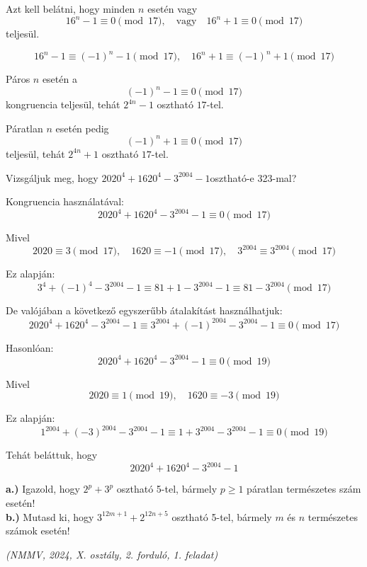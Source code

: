 \begin{solution}
	Azt kell belátni, hogy minden $n$ esetén vagy 
	\[
	16^{n}-1\equiv0\pmod{17},\quad\text{vagy}\quad16^{n}+1\equiv0\pmod{17}
	\]
	teljesül.
	
	\[
	16^{n}-1\equiv(-1)^{n}-1\pmod{17},\quad16^{n}+1\equiv(-1)^{n}+1\pmod{17}
	\]
	
	Páros $n$ esetén a 
	\[
	(-1)^{n}-1\equiv0\pmod{17}
	\]
	kongruencia teljesül, tehát $2^{4n}-1$ osztható $17$-tel.
	
	Páratlan $n$ esetén pedig 
	\[
	(-1)^{n}+1\equiv0\pmod{17}
	\]
	teljesül, tehát $2^{4n}+1$ osztható $17$-tel. 
\end{solution}
\vspace{0.5cm}

\begin{extraproblem}
	Vizsgáljuk meg, hogy $2020^{4}+1620^{4}-3^{2004}-1$\quad{}osztható-e
	323-mal?
\end{extraproblem}

\vspace{0.5cm}

\begin{solution}
	Kongruencia használatával: 
	\[
	2020^{4}+1620^{4}-3^{2004}-1\equiv0\pmod{17}
	\]
	
	Mivel 
	\[
	2020\equiv3\pmod{17},\quad1620\equiv-1\pmod{17},\quad3^{2004}\equiv3^{2004}\pmod{17}
	\]
	
	Ez alapján: 
	\[
	3^{4}+(-1)^{4}-3^{2004}-1\equiv81+1-3^{2004}-1\equiv81-3^{2004}\pmod{17}
	\]
	
	De valójában a következő egyszerűbb átalakítást használhatjuk: 
	\[
	2020^{4}+1620^{4}-3^{2004}-1\equiv3^{2004}+(-1)^{2004}-3^{2004}-1\equiv0\pmod{17}
	\]
	
	Hasonlóan: 
	\[
	2020^{4}+1620^{4}-3^{2004}-1\equiv0\pmod{19}
	\]
	
	Mivel 
	\[
	2020\equiv1\pmod{19},\quad1620\equiv-3\pmod{19}
	\]
	
	Ez alapján: 
	\[
	1^{2004}+(-3)^{2004}-3^{2004}-1\equiv1+3^{2004}-3^{2004}-1\equiv0\pmod{19}
	\]
	
	Tehát beláttuk, hogy 
	\[
	2020^{4}+1620^{4}-3^{2004}-1
	\]
\end{solution}
\begin{extraproblem}
	
	\textbf{a.)} Igazold, hogy $2^{p}+3^{p}$ osztható 5-tel, bármely
	$p\geq1$ páratlan természetes szám esetén! \\
	\textbf{b.)} Mutasd ki, hogy $3^{12m+1}+2^{12n+5}$ osztható 5-tel,
	bármely $m$ és $n$ természetes számok esetén! 
	\begin{flushright}
		\textit{(NMMV, 2024, X. osztály, 2. forduló, 1. feladat)} 
		\par\end{flushright}
\end{extraproblem}

